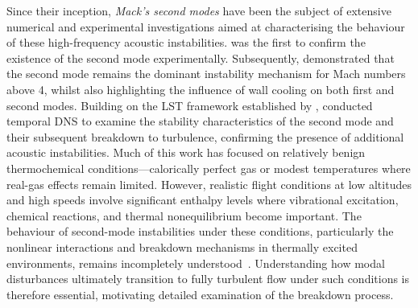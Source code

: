 

Since their inception, \textit{Mack's second modes} have been the subject of extensive numerical and experimental investigations aimed at characterising the behaviour of these high-frequency acoustic instabilities. \citet{Kendall1975} was the first to confirm the existence of the second mode experimentally. Subsequently, \citet{Lysenko1984} demonstrated that the second mode remains the dominant instability mechanism for Mach numbers above 4, whilst also highlighting the influence of wall cooling on both first and second modes. Building on the \gls{LST} framework established by \citet{Mack1963}, \citet{Erlebacher1990} conducted temporal \gls{DNS} to examine the stability characteristics of the second mode and their subsequent breakdown to turbulence, confirming the presence of additional acoustic instabilities. Much of this work has focused on relatively benign thermochemical conditions—calorically perfect gas or modest temperatures where real-gas effects remain limited. However, realistic flight conditions at low altitudes and high speeds involve significant enthalpy levels where vibrational excitation, chemical reactions, and thermal nonequilibrium become important. The behaviour of second-mode instabilities under these conditions, particularly the nonlinear interactions and breakdown mechanisms in thermally excited environments, remains incompletely understood~\citep{MiroMiro2019}. Understanding how modal disturbances ultimately transition to fully turbulent flow under such conditions is therefore essential, motivating detailed examination of the breakdown process.

